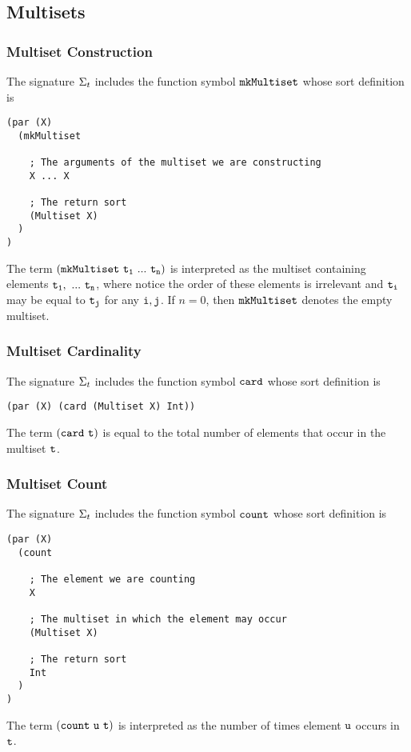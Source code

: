 \documentclass[english,a4paper,10pt]{article}
\begin{document}
\subsection{Multisets}

\subsubsection{Multiset Construction}
The signature $\Sigma_{t}$ includes 
the function symbol ${\tt mkMultiset}$ whose sort definition is
\begin{verbatim}
(par (X) 
  (mkMultiset
  
    ; The arguments of the multiset we are constructing
    X ... X
    
    ; The return sort
    (Multiset X)
  )
)
\end{verbatim}
The term $\syntax{(mkMultiset\ t_1\ ...\ t_n)}$ is
interpreted as the multiset containing elements ${\tt t_1,\ ...\ t_n}$, 
where notice the order of these elements is irrelevant
and ${\tt t_i}$ may be equal to ${\tt t_j}$ for any ${\tt i},{\tt j}$.
If $n=0$,
then ${\tt mkMultiset}$ denotes the empty multiset.

\subsubsection{Multiset Cardinality}
The signature $\Sigma_{t}$ includes 
the function symbol ${\tt card}$ whose sort definition is
\begin{verbatim}
(par (X) (card (Multiset X) Int))
\end{verbatim}
The term ${\tt (card\ t)}$ is equal to
the total number of elements that occur in the multiset ${\tt t}$.

\subsubsection{Multiset Count}
The signature $\Sigma_{t}$ includes 
the function symbol ${\tt count}$ whose sort definition is
\begin{verbatim}
(par (X)
  (count 
  
    ; The element we are counting
    X 
    
    ; The multiset in which the element may occur
    (Multiset X)
    
    ; The return sort
    Int
  )
)
\end{verbatim}
The term ${\tt (count\ u\ t)}$ is
interpreted as the number of times element ${\tt u}$ occurs in ${\tt t}$.
\end{document}
